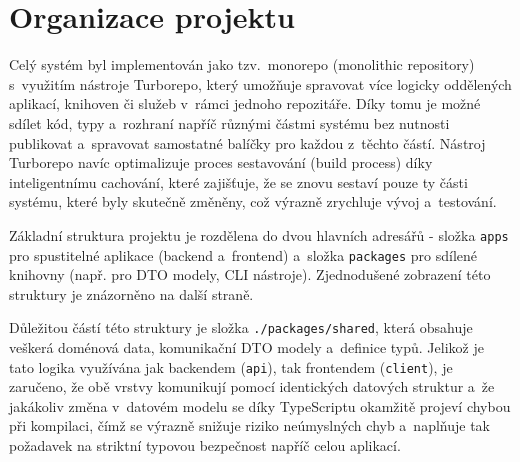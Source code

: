 \documentclass[czech, ing, kiv, he, iso690numb, viewonly]{fasthesis}
\begin{document}
\section{Organizace projektu}

Celý systém byl implementován jako tzv.~monorepo (monolithic repository) s~využitím nástroje Turborepo,
který umožňuje spravovat více logicky oddělených aplikací, knihoven či služeb v~rámci jednoho repozitáře.
Díky tomu je možné sdílet kód, typy a~rozhraní napříč různými částmi systému bez nutnosti publikovat a~spravovat
samostatné balíčky pro každou z~těchto částí. Nástroj Turborepo navíc optimalizuje proces sestavování (build process)
díky inteligentnímu cachování, které zajišťuje, že se znovu sestaví pouze ty části systému, které byly skutečně změněny, 
což výrazně zrychluje vývoj a~testování.

Základní struktura projektu je rozdělena do dvou hlavních adresářů - složka \texttt{apps} pro spustitelné aplikace (backend a~frontend) a~složka \texttt{packages} pro sdílené knihovny (např. pro DTO modely, CLI nástroje).
Zjednodušené zobrazení této struktury je znázorněno na další straně.

\newpage
\vspace{1em}
\vspace{1em}

Důležitou částí této struktury je složka \texttt{./packages/shared}, která obsahuje veškerá doménová data, komunikační DTO modely a~definice typů.
Jelikož je tato logika využívána jak backendem (\texttt{api}), tak frontendem (\texttt{client}), je zaručeno, 
že obě vrstvy komunikují pomocí identických datových struktur a~že jakákoliv změna v~datovém modelu se díky TypeScriptu okamžitě projeví chybou při 
kompilaci, čímž se výrazně snižuje riziko neúmyslných chyb a~naplňuje tak požadavek na striktní typovou bezpečnost napříč celou aplikací.
\end{document}

